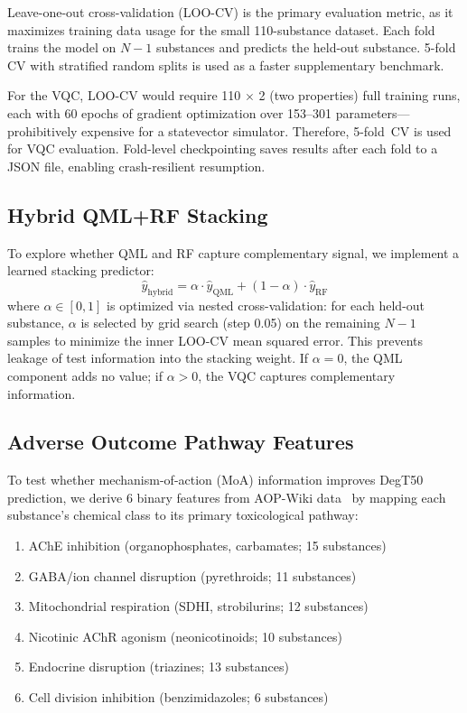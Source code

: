 \documentclass[twoside,twocolumn,9pt]{article}
\newcommand{\degtl}{DegT50}
\newcommand{\loocv}{LOO-CV}
\newcommand{\nsub}{110}
\begin{document}
Leave-one-out cross-validation (\loocv{}) is the primary evaluation metric,
as it maximizes training data usage for the small \nsub{}-substance dataset.
Each fold trains the model on $N-1$ substances and predicts the held-out
substance. 5-fold CV with stratified random splits is used as a faster
supplementary benchmark.

For the VQC, \loocv{} would require \nsub{} $\times$ 2 (two properties)
full training runs, each with 60 epochs of gradient optimization over
153--301 parameters---prohibitively expensive for a statevector simulator.
Therefore, 5-fold~CV is used for VQC evaluation. Fold-level checkpointing
saves results after each fold to a JSON file, enabling crash-resilient
resumption.


\subsection{Hybrid QML+RF Stacking}
\label{sec:hybrid}

To explore whether QML and RF capture complementary signal, we implement
a learned stacking predictor:
\begin{equation}
  \hat{y}_\text{hybrid} = \alpha \cdot \hat{y}_\text{QML} +
                           (1 - \alpha) \cdot \hat{y}_\text{RF}
\end{equation}
where $\alpha \in [0, 1]$ is optimized via nested cross-validation:
for each held-out substance, $\alpha$ is selected by grid search
(step 0.05) on the remaining $N-1$ samples to minimize the inner
\loocv{} mean squared error. This prevents leakage of test information
into the stacking weight. If $\alpha = 0$, the QML
component adds no value; if $\alpha > 0$, the VQC captures complementary
information.


\subsection{Adverse Outcome Pathway Features}
\label{sec:aop}

To test whether mechanism-of-action (MoA) information improves \degtl{}
prediction, we derive 6 binary features from AOP-Wiki
data~\cite{aopwiki2024, villeneuve2014} by mapping each substance's
chemical class to its primary toxicological pathway:

\begin{enumerate}[nosep]
  \item AChE inhibition (organophosphates, carbamates; 15 substances)
  \item GABA/ion channel disruption (pyrethroids; 11 substances)
  \item Mitochondrial respiration (SDHI, strobilurins; 12 substances)
  \item Nicotinic AChR agonism (neonicotinoids; 10 substances)
  \item Endocrine disruption (triazines; 13 substances)
  \item Cell division inhibition (benzimidazoles; 6 substances)
\end{enumerate}
\end{document}
